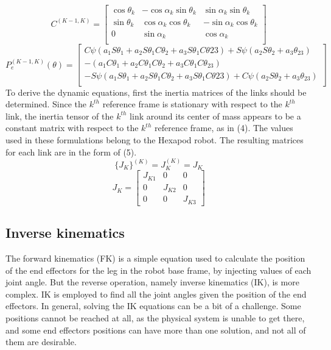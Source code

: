 \begin{equation}
C^{(K-1,K)} =
\begin{bmatrix}
\cos\theta_k &-\cos\alpha_k\sin\theta_k &\sin\alpha_k\sin\theta_k \\
\sin\theta_k &\cos\alpha_k\cos\theta_k &-\sin\alpha_k\cos\theta_k \\
0 &\sin\alpha_k &\cos\alpha_k \\ 
\end{bmatrix}
\end{equation}
\begin{equation}
P_e^{(K-1,K)} (\theta) =
\begin{bmatrix}
C\psi(a_1S\theta_1+a_2S\theta_1C\theta_2+a_3S\theta_1C\theta{23})+S\psi(a_2S\theta_2+a_3\theta_{23}) \\
-(a_1C\theta_1+a_2C\theta_1C\theta_2+a_3C\theta_1C\theta_{23})  \\
-S\psi(a_1S\theta_1+a_2S\theta_1C\theta_2+a_3S\theta_1C\theta{23})+C\psi(a_2S\theta_2+a_3\theta_{23}) \\
\end{bmatrix}
\end{equation}
To derive the dynamic equations, first the inertia matrices of the links should be determined. Since the $k^{th}$ reference frame is stationary with respect to the $k^{th}$ link, the inertia tensor of the $k^{th}$ link around its center of mass appears to be a constant matrix with respect to the $k^{th}$ reference frame, as in (4). The values used in these formulations belong to the Hexapod robot. The resulting matrices for each link are in the form of (5).
\begin{equation}
\{J_K\}^{(K)} = J_K^{(K)} = J_K
\end{equation}
\begin{equation}
J_K = \begin{bmatrix}
J_{K1} & 0      & 0 \\
0      & J_{K2} & 0 	\\
0      & 0      & J_{K3} 
\end{bmatrix}
\end{equation}


\subsection{Inverse kinematics}
The forward kinematics (FK) is a simple equation used to calculate the position of the end effectors for the leg in the robot base frame, by injecting values of each joint angle. But the reverse operation, namely inverse kinematics (IK), is more complex. IK is employed to find all the joint angles given the position of the end effectors. In general, solving the IK equations can be a bit of a challenge. Some positions cannot be reached at all, as the physical system is unable to get there, and some end effectors positions can have more than one solution, and not all of them are desirable.

